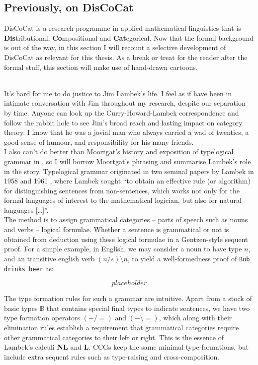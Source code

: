 \begin{fullwidth}
\section{Previously, on DisCoCat}

DisCoCat is a research programme in applied mathematical linguistics that is \textbf{Dis}tributional, \textbf{Co}mpositional and \textbf{Cat}egorical. Now that the formal background is out of the way, in this section I will recount a selective development of DisCoCat as relevant for this thesis. As a break or treat for the reader after the formal stuff, this section will make use of hand-drawn cartoons.

\\

It's hard for me to do justice to Jim Lambek's life. I feel as if have been in intimate conversation with Jim throughout my research, despite our separation by time. Anyone can look up the Curry-Howard-Lambek correspondence and follow the rabbit hole to see Jim's broad reach and lasting impact on category theory. I know that he was a jovial man who always carried a wad of twenties, a good sense of humour, and responsibility for his many friends.\\

I also can't do better than Moortgat's history and exposition of typelogical grammar in \citep{}, so I will borrow Moortgat's phrasing and summarise Lambek's role in the story. Typelogical grammar originated in two seminal papers by Lambek in 1958 and 1961 \citep{}, where Lambek sought “to obtain an effective rule (or algorithm) for distinguishing sentences from non-sentences, which works not only for the formal languages of interest to the mathematical logician, but also for natural languages […]”.\\

The method is to assign grammatical categories -- parts of speech such as nouns and verbs -- logical formulae. Whether a sentence is grammatical or not is obtained from deduction using these logical formulae in a Gentzen-style sequent proof. For a simple example, in English, we may consider a noun to have type $n$, and an transitive english verb $(n/s)\setminus n$, to yield a well-formedness proof of \texttt{Bob drinks beer} as:

\[placeholder\]

The type formation rules for such a grammar are intuitive. Apart from a stock of basic types $\mathbb{B}$ that contains special final types to indicate sentences, we have two type formation operators $(-/=)$ and $(- \setminus =)$, which along with their elimination rules establish a requirement that grammatical categories require other grammatical categories to their left or right. This is the essence of Lambek's calculi \textbf{NL} and \textbf{L}. CCGs keep the same minimal type-formations, but include extra sequent rules such as type-raising and cross-composition.\\


\end{fullwidth}
